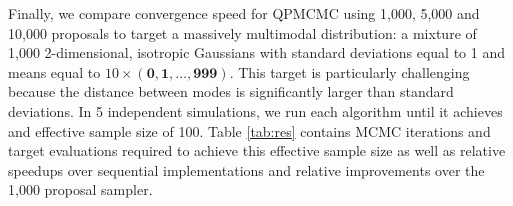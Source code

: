\documentclass[12pt]{article} %
\begin{document}

\sloppy
Finally, we compare convergence speed for QPMCMC using 1,000, 5,000 and 10,000 proposals to target a massively multimodal distribution: a mixture of 1,000 2-dimensional, isotropic Gaussians with standard deviations equal to 1 and means equal to $10\times(\boldsymbol{0}, \boldsymbol{1} , \dots , \boldsymbol{999})$. This target is particularly challenging because the distance between modes is significantly larger than standard deviations. In 5 independent simulations, we run each algorithm until it achieves and effective sample size of 100.  Table \ref{tab:res} contains MCMC iterations and target evaluations required to achieve this effective sample size as well as relative speedups over sequential implementations and relative improvements over the 1,000 proposal sampler.

\let\oldtabular\tabular
\let\endoldtabular\endtabular
\renewenvironment{tabular}{\rowcolors{2}{white}{trevorblue!15}\oldtabular}{\endoldtabular}
\end{document}
